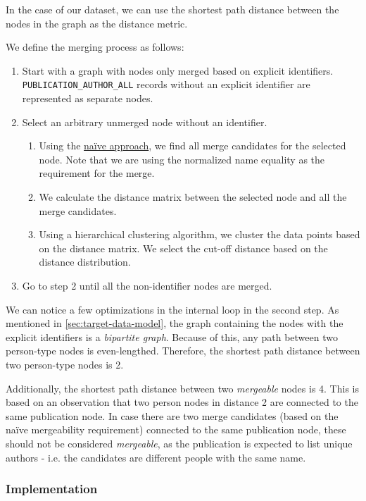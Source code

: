 In the case of our dataset, we can use the shortest path distance between the nodes in the graph as the distance metric.

We define the merging process as follows:

\begin{enumerate}
    \item Start with a graph with nodes only merged based on explicit identifiers. \texttt{PUBLICATION\_AUTHOR\_ALL} records without an explicit identifier are represented as separate nodes.
    \item Select an arbitrary unmerged node without an identifier.
    \begin{enumerate}
        \item Using the \hyperref[sec:naive-approach]{naïve approach}, we find all merge candidates for the selected node. Note that we are using the normalized name equality as the requirement for the merge.
        \item We calculate the distance matrix between the selected node and all the merge candidates.
        \item Using a hierarchical clustering algorithm, we cluster the data points based on the distance matrix. We select the cut-off distance based on the distance distribution.
    \end{enumerate}
    \item Go to step 2 until all the non-identifier nodes are merged.
\end{enumerate}

We can notice a few optimizations in the internal loop in the second step.
As mentioned in \ref{sec:target-data-model}, the graph containing the nodes with the explicit identifiers is a \textit{bipartite graph}.
Because of this, any path between two person-type nodes is even-lengthed.
Therefore, the shortest path distance between two person-type nodes is 2.

Additionally, the shortest path distance between two \textit{mergeable} nodes is 4.
This is based on an observation that two person nodes in distance 2 are connected to the same publication node.
In case there are two merge candidates (based on the naïve mergeability requirement) connected to the same publication node,
these should not be considered \textit{mergeable}, as the publication is expected to list unique authors - i.e. the candidates are
different people with the same name.

\subsubsection{Implementation}

